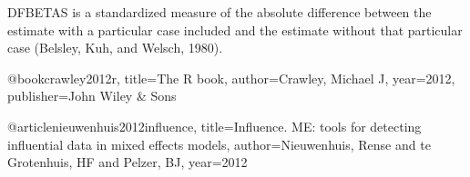 DFBETAS is a standardized measure of the absolute difference between the estimate with a particular
case included and the estimate without that particular case (Belsley, Kuh, and Welsch, 1980).




@book{crawley2012r,
  title={The R book},
  author={Crawley, Michael J},
  year={2012},
  publisher={John Wiley \& Sons}
}

@article{nieuwenhuis2012influence,
  title={Influence. ME: tools for detecting influential data in mixed effects models},
  author={Nieuwenhuis, Rense and te Grotenhuis, HF and Pelzer, BJ},
  year={2012}
}
